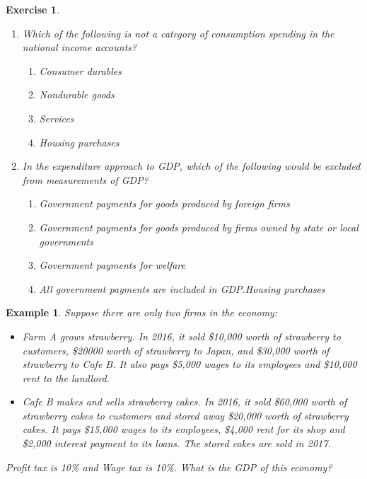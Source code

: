\documentclass[12pt]{article}
\newtheorem{example}{Example}
\newtheorem{exercise}{Exercise}
\numberwithin{equation}{section}
\begin{document}
\begin{exercise}
    \begin{enumerate}[label=(\arabic*)]
        \item Which of the following is not a category of consumption spending in the national income accounts?
        \begin{enumerate}[label=\Alph*.]
            \item Consumer durables
            \item Nondurable goods
            \item Services
            \item Housing purchases
        \end{enumerate}
        \item In the expenditure approach to GDP, which of the following would be excluded from measurements of GDP?
        \begin{enumerate}[label=\Alph*.]
            \item Government payments for goods produced by foreign firms
            \item Government payments for goods produced by firms owned by state or local governments
            \item Government payments for welfare 
            \item All government payments are included in GDP.Housing purchases
        \end{enumerate}
    \end{enumerate}
\end{exercise}


\begin{example}
    Suppose there are only two firms in the economy:
    \begin{itemize}
        \item Farm A grows strawberry. In 2016, it sold \$10,000 worth of strawberry to customers, \$20000 worth of strawberry to Japan, and \$30,000 worth of strawberry to Cafe B. It also pays \$5,000 wages to its employees and \$10,000 rent to the landlord.
        \item Cafe B makes and sells strawberry cakes. In 2016, it sold \$60,000 worth of strawberry cakes to customers and stored away \$20,000 worth of strawberry cakes. It pays \$15,000 wages to its employees, \$4,000 rent for its shop and \$2,000 interest payment to its loans. The stored cakes are sold in 2017.
    \end{itemize}
    Profit tax is 10\% and Wage tax is 10\%. What is the GDP of this economy?
\end{example}
\end{document}

